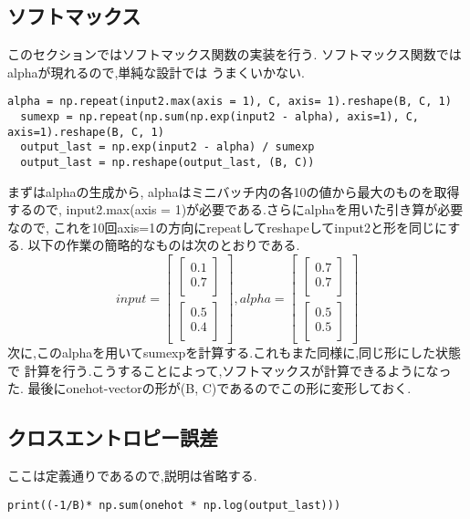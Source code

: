 \documentclass[a4paper,11pt]{jsarticle}
\begin{document}
\subsection*{ソフトマックス}
このセクションではソフトマックス関数の実装を行う.
ソフトマックス関数ではalphaが現れるので,単純な設計では
うまくいかない.
\begin{lstlisting}[caption=SoftMax]
  alpha = np.repeat(input2.max(axis = 1), C, axis= 1).reshape(B, C, 1)
  sumexp = np.repeat(np.sum(np.exp(input2 - alpha), axis=1), C, axis=1).reshape(B, C, 1)
  output_last = np.exp(input2 - alpha) / sumexp
  output_last = np.reshape(output_last, (B, C))
\end{lstlisting}
まずはalphaの生成から, alphaはミニバッチ内の各10の値から最大のものを取得するので,
input2.max(axis = 1)が必要である.さらにalphaを用いた引き算が必要なので, 
これを10回axis=1の方向にrepeatしてreshapeしてinput2と形を同じにする.
以下の作業の簡略的なものは次のとおりである.
$$
input = \begin{bmatrix}
  \begin{bmatrix}
    0.1 \\
    0.7 \\
  \end{bmatrix} \\
  \begin{bmatrix}
    0.5 \\
    0.4 \\
  \end{bmatrix}
\end{bmatrix}, alpha = \begin{bmatrix}
  \begin{bmatrix}
    0.7 \\
    0.7 \\
  \end{bmatrix} \\
  \begin{bmatrix}
    0.5 \\
    0.5 \\
  \end{bmatrix}
\end{bmatrix}
$$
次に,このalphaを用いてsumexpを計算する.これもまた同様に,同じ形にした状態で
計算を行う.こうすることによって,ソフトマックスが計算できるようになった.
最後にonehot-vectorの形が(B, C)であるのでこの形に変形しておく.

\subsection*{クロスエントロピー誤差}
ここは定義通りであるので,説明は省略する.
\begin{lstlisting}[caption=CrossEntropy]
  print((-1/B)* np.sum(onehot * np.log(output_last)))
\end{lstlisting}
\end{document}
